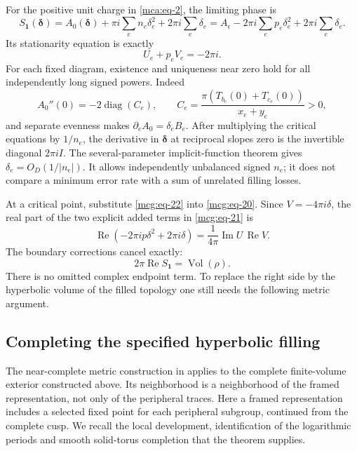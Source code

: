 For the positive unit charge in \eqref{mca:eq-2}, the limiting phase is
\begin{equation}\label{mcg:eq-21}
S_{\boldsymbol1}(\boldsymbol\delta)
    =A_0(\boldsymbol\delta)
       +\pi i\sum_e n_e\delta_e^2+2\pi i\sum_e\delta_e
    =A_\epsilon-2\pi i\sum_e p_e\delta_e^2
                          +2\pi i\sum_e\delta_e .
\end{equation} Its stationarity equation is exactly \begin{equation}\label{mcg:eq-22}
U_e+p_eV_e=-2\pi i.
\end{equation} For each fixed diagram, existence and uniqueness near zero hold for
all independently long signed powers. Indeed \begin{equation}\label{mcg:eq-23}
A_0''(0)=-2\operatorname{diag}(C_e),\qquad
 C_e=\frac{\pi(T_{b_e}(0)+T_{c_e}(0))}{x_e+y_e}>0,
\end{equation} and separate evenness makes \(\partial_e A_0=\delta_e B_e\). After
multiplying the critical equations by \(1/n_e\), the derivative in
\(\boldsymbol\delta\) at reciprocal slopes zero is the invertible
diagonal \(2\pi i I\). The several-parameter implicit-function theorem
gives \(\delta_e=O_D(1/|n_e|)\). It allows independently unbalanced
signed \(n_e\); it does not compare a minimum error rate with a sum of
unrelated filling losses.

At a critical point, substitute \eqref{mcg:eq-22} into
\eqref{mcg:eq-20}. Since \(V=-4\pi i\delta\), the real part of the two
explicit added terms in \eqref{mcg:eq-21} is \begin{equation}\label{mcg:eq-24}
\operatorname{Re}(-2\pi i p\delta^2+2\pi i\delta)
       =\frac{1}{4\pi}\operatorname{Im}U\,\operatorname{Re}V .
\end{equation} The boundary corrections cancel exactly: \begin{equation}\label{mcg:eq-25}
2\pi\operatorname{Re}S_{\boldsymbol1}
                        =\operatorname{Vol}(\rho).
\end{equation} There is no omitted complex endpoint term. To replace the right side
by the hyperbolic volume of the filled topology one still needs the
following metric argument.

\subsection{Completing the specified hyperbolic
filling}\label{mcg:sec-7}

The near-complete metric construction in
\cite[Proposition 6.1]{MarkedFillings} applies to the complete
finite-volume exterior constructed above. Its neighborhood is a neighborhood of
the framed representation, not only of the peripheral traces.
Here a framed representation includes a selected fixed point for each
peripheral subgroup, continued from the complete cusp. We recall the
local development, identification of the logarithmic periods and smooth
solid-torus completion that the theorem supplies.

